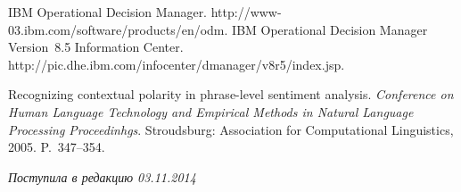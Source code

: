 \begin{multicols}{2}
{{\begin{thebibliography}{99}
 IBM Operational Decision Manager.
 {\sf http://www-03.\linebreak ibm.com/software/products/en/odm}.
IBM Operational Decision Manager Version~8.5 Information Center.
{\sf http://pic.dhe.ibm.com/infocenter/\linebreak dmanager/v8r5/index.jsp}.

Recognizing contextual polarity in phrase-level sentiment analysis.
\textit{Conference on Human Language Technology and Empirical Methods in Natural
Language Processing Proceedinhgs}.
Stroudsburg: Association for Computational Linguistics, 2005. P.~347--354.

\end{thebibliography}
} }

\end{multicols}

 \label{end\stat}

 \vspace*{-3pt}

\hfill{\small\textit{Поступила в редакцию 03.11.2014}}
\renewcommand{\figurename}{\protect\bf Рис.}